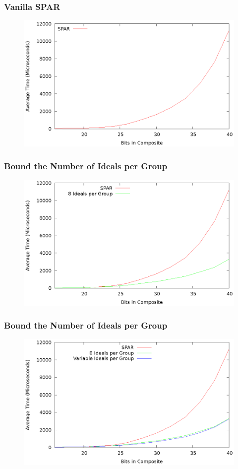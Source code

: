 \documentclass{beamer}
\begin{document}
\begin{frame}
\frametitle{Vanilla SPAR}
\begin{figure}
\includegraphics[scale=0.86]{spar-vanilla}
\end{figure}
\end{frame}
\begin{frame}
\frametitle{Bound the Number of Ideals per Group}
\begin{figure}
\includegraphics[scale=0.86]{spar-bound-attempts}
\end{figure}
\end{frame}
\begin{frame}
\frametitle{Bound the Number of Ideals per Group}
\begin{figure}
\includegraphics[scale=0.86]{spar-bound-attempts2}
\end{figure}
\end{frame}
\end{document}
